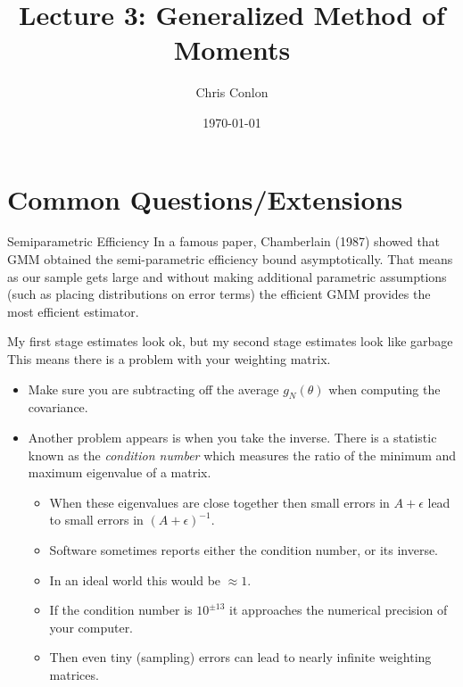 

\title{Lecture 3: Generalized Method of Moments}
\author{Chris Conlon }


\newcommand{\fp}{\frame[plain]}

\date{\today}


\maketitle


\section*{\normalsize  Common Questions/Extensions}

\begin{frame}{Semiparametric Efficiency}
In a famous paper, Chamberlain (1987) showed that GMM obtained the semi-parametric efficiency bound asymptotically. That means as our sample gets large and without making additional parametric assumptions (such as placing distributions on error terms) the efficient GMM provides the most efficient estimator.
\end{frame}

\begin{frame}{My first stage estimates look ok, but my second stage estimates look like garbage}
This means there is a problem with your weighting matrix. 
\begin{itemize}
\item Make sure you are subtracting off the average $g_N(\theta)$ when computing the covariance. 
\item Another problem appears is when you take the inverse. There is a statistic known as the \textit{condition number} which measures the ratio of the minimum and maximum eigenvalue of a matrix.
\begin{itemize}
\item When these eigenvalues are close together then small errors in $A+\epsilon$ lead to small errors in $(A+\epsilon)^{-1}$.
\item Software sometimes reports either the condition number, or its inverse.
\item In an ideal world this would be $\approx 1$. 
\item If the condition number is $10^{\pm 13}$ it approaches the numerical precision of your computer. 
\item Then even tiny (sampling) errors can lead to nearly infinite weighting matrices.
\end{itemize}
\end{itemize}
\end{frame}

